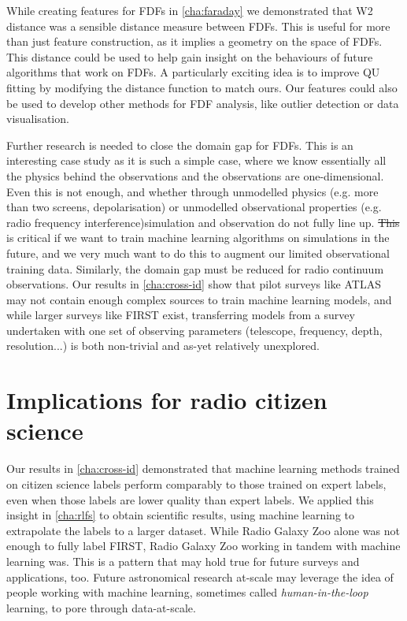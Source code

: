 \documentclass[11pt, a4paper]{book}
\newcommand{\defn}[1]{\emph{#1}}
\providecommand{\DIFaddtex}[1]{{\protect\color{blue}\uwave{#1}}} %
\providecommand{\DIFdeltex}[1]{{\protect\color{red}\sout{#1}}}                      %
\providecommand{\DIFaddbegin}{} %
\providecommand{\DIFaddend}{} %
\providecommand{\DIFdelbegin}{} %
\providecommand{\DIFdelend}{} %
\providecommand{\DIFadd}[1]{\texorpdfstring{\DIFaddtex{#1}}{#1}} %
\providecommand{\DIFdel}[1]{\texorpdfstring{\DIFdeltex{#1}}{}} %
\newcommand{\DIFscaledelfig}{0.5}
\newlength{\DIFdelgraphicswidth} %
\newlength{\DIFdelgraphicsheight} %
\newcommand{\DIFaddincludegraphics}[2][]{{\color{blue}\fbox{\DIFOincludegraphics[#1]{#2}}}} %
\newcommand{\DIFdelincludegraphics}[2][]{%
\sbox{\DIFdelgraphicsbox}{\DIFOincludegraphics[#1]{#2}}%
\settoboxwidth{\DIFdelgraphicswidth}{\DIFdelgraphicsbox} %
\settoboxtotalheight{\DIFdelgraphicsheight}{\DIFdelgraphicsbox} %
\scalebox{\DIFscaledelfig}{%
\parbox[b]{\DIFdelgraphicswidth}{\usebox{\DIFdelgraphicsbox}\\[-\baselineskip] \rule{\DIFdelgraphicswidth}{0em}}\llap{\resizebox{\DIFdelgraphicswidth}{\DIFdelgraphicsheight}{%
\setlength{\unitlength}{\DIFdelgraphicswidth}%
\begin{picture}(1,1)%
\thicklines\linethickness{2pt} %
{\color[rgb]{1,0,0}\put(0,0){\framebox(1,1){}}}%
{\color[rgb]{1,0,0}\put(0,0){\line( 1,1){1}}}%
{\color[rgb]{1,0,0}\put(0,1){\line(1,-1){1}}}%
\end{picture}%
}\hspace*{3pt}}} %
} %
\DeclareRobustCommand{\DIFaddbegin}{\DIFOaddbegin \let\includegraphics\DIFaddincludegraphics} %
\DeclareRobustCommand{\DIFaddend}{\DIFOaddend \let\includegraphics\DIFOincludegraphics} %
\DeclareRobustCommand{\DIFdelbegin}{\DIFOdelbegin \let\includegraphics\DIFdelincludegraphics} %
\DeclareRobustCommand{\DIFdelend}{\DIFOaddend \let\includegraphics\DIFOincludegraphics} %
\begin{document}
     While creating features for FDFs in \autoref{cha:faraday} we demonstrated that W2 distance was a sensible distance measure between FDFs. This is useful for more than just feature construction, as it implies a geometry on the space of FDFs. This distance could be used to help gain insight on the behaviours of future algorithms that work on FDFs. A particularly exciting idea is to improve QU fitting by modifying the distance function to match ours. Our features could also be used to develop other methods for FDF analysis, like outlier detection or data visualisation.

     Further research is needed to close the domain gap for FDFs. This is an interesting case study as it is such a simple case, where we know essentially all the physics behind the observations and the observations are one-dimensional. Even this is not enough, and whether through unmodelled physics (e.g. more than two screens, depolarisation) or unmodelled observational properties (e.g. radio frequency interference)\DIFaddbegin \DIFadd{, }\DIFaddend simulation and observation do not fully line up. \DIFdelbegin \DIFdel{This }\DIFdelend \DIFaddbegin \DIFadd{Such research }\DIFaddend is critical if we want to train machine learning algorithms on simulations in the future, and we very much want to do this to augment our limited observational training data. Similarly, the domain gap must be reduced for radio continuum observations. Our results in \autoref{cha:cross-id} show that pilot surveys like ATLAS may not contain enough complex sources to train machine learning models, and while larger surveys like FIRST exist, transferring models from a survey undertaken with one set of observing parameters (telescope, frequency, depth, resolution...) is both non-trivial and as-yet relatively unexplored.

\section{Implications for radio citizen science}
\label{sec:implications-citizen-science}

    Our results in \autoref{cha:cross-id} demonstrated that machine learning methods trained on citizen science labels perform comparably to those trained on expert labels, even when those labels are lower quality than expert labels. We applied this insight in \autoref{cha:rlfs} to obtain scientific results, using machine learning to extrapolate the labels to a larger dataset. While Radio Galaxy Zoo alone was not enough to fully label FIRST, Radio Galaxy Zoo working in tandem with machine learning was. This is a pattern that may hold true for future surveys and applications, too. Future astronomical research at-scale may leverage the idea of people working with machine learning, sometimes called \defn{human-in-the-loop} \citep[e.g.][]{holzinger_interactive_2016} learning, to pore through data-at-scale.
\end{document}
